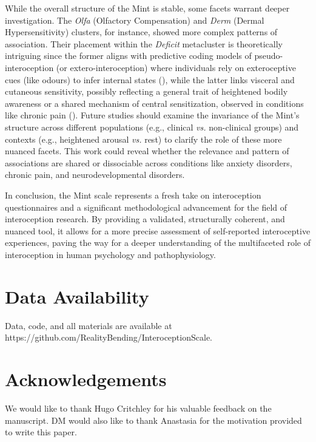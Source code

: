 \documentclass[
  jou,
  floatsintext,
  longtable,
  nolmodern,
  notxfonts,
  notimes,
  colorlinks=true,linkcolor=blue,citecolor=blue,urlcolor=blue]{apa7}
\begin{document}
While the overall structure of the Mint is stable, some facets warrant
deeper investigation. The \emph{Olfa} (Olfactory Compensation) and
\emph{Derm} (Dermal Hypersensitivity) clusters, for instance, showed
more complex patterns of association. Their placement within the
\emph{Deficit} metacluster is theoretically intriguing since the former
aligns with predictive coding models of pseudo-interoception (or
extero-interoception) where individuals rely on exteroceptive cues (like
odours) to infer internal states
(), while
the latter links visceral and cutaneous sensitivity, possibly reflecting
a general trait of heightened bodily awareness or a shared mechanism of
central sensitization, observed in conditions like chronic pain
(). Future
studies should examine the invariance of the Mint's structure across
different populations (e.g., clinical \emph{vs.} non-clinical groups)
and contexts (e.g., heightened arousal \emph{vs.} rest) to clarify the
role of these more nuanced facets. This work could reveal whether the
relevance and pattern of associations are shared or dissociable across
conditions like anxiety disorders, chronic pain, and neurodevelopmental
disorders.

In conclusion, the Mint scale represents a fresh take on interoception
questionnaires and a significant methodological advancement for the
field of interoception research. By providing a validated, structurally
coherent, and nuanced tool, it allows for a more precise assessment of
self-reported interoceptive experiences, paving the way for a deeper
understanding of the multifaceted role of interoception in human
psychology and pathophysiology.

\section{Data Availability}\label{data-availability}

Data, code, and all materials are available at
https://github.com/RealityBending/InteroceptionScale.

\section{Acknowledgements}\label{acknowledgements}

We would like to thank Hugo Critchley for his valuable feedback on the
manuscript. DM would also like to thank Anastasia for the motivation
provided to write this paper.
\end{document}
